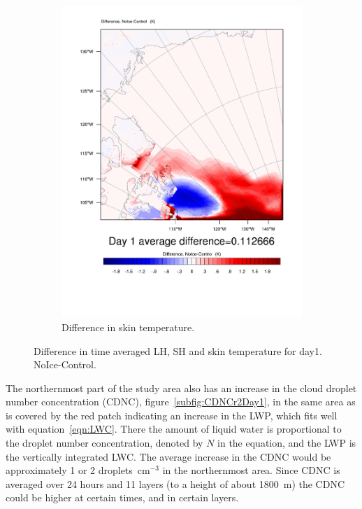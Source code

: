 \begin{figure}
		\begin{subfigure}{0.48\textwidth}
		\includegraphics[width=\textwidth]{results/noice/diff_NoIce_skintemp_Day1.pdf}
		\caption{Difference in skin temperature.}
		\label{subfig:skin_r2Day1}
	\end{subfigure}
	\caption{Difference in time averaged LH, SH and skin temperature for day1. NoIce-Control.}
	\label{fig:lhshskin_r2Day1}
\end{figure}

The northernmost part of the study area also has an increase in the cloud droplet number concentration (CDNC), figure~\ref{subfig:CDNCr2Day1}, in the same area as is covered by the red patch indicating an increase in the LWP, which fits well with equation~\ref{eqn:LWC}. There the amount of liquid water is proportional to the droplet number concentration, denoted by $N$ in the equation, and the LWP is the vertically integrated LWC. The average increase in the CDNC would be approximately 1 or 2 droplets~$\text{cm}^{-3}$ in the northernmost area. Since CDNC is averaged over 24 hours and 11 layers (to a height of about 1800~m) the CDNC could be higher at certain times, and in certain layers.

